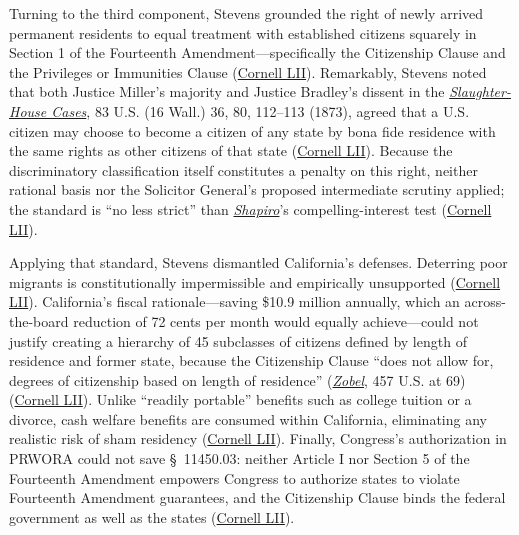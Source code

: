 \documentclass[12pt]{article}
\begin{document}
Turning to the third component, Stevens grounded the right of newly arrived permanent residents to equal treatment with established citizens squarely in Section 1 of the Fourteenth Amendment---specifically the Citizenship Clause and the Privileges or Immunities Clause (\href{https://www.law.cornell.edu/supremecourt/text/98-97}{Cornell LII}). Remarkably, Stevens noted that both Justice Miller's majority and Justice Bradley's dissent in the \href{https://www.law.cornell.edu/supremecourt/text/83/36}{\textit{Slaughter-House Cases}}, 83 U.S. (16 Wall.) 36, 80, 112--113 (1873), agreed that a U.S. citizen may choose to become a citizen of any state by bona fide residence with the same rights as other citizens of that state (\href{https://www.law.cornell.edu/supremecourt/text/98-97}{Cornell LII}). Because the discriminatory classification itself constitutes a penalty on this right, neither rational basis nor the Solicitor General's proposed intermediate scrutiny applied; the standard is ``no less strict'' than \href{https://supreme.justia.com/cases/federal/us/394/618/}{\textit{Shapiro}}'s compelling-interest test (\href{https://www.law.cornell.edu/supremecourt/text/98-97}{Cornell LII}).

Applying that standard, Stevens dismantled California's defenses. Deterring poor migrants is constitutionally impermissible and empirically unsupported (\href{https://www.law.cornell.edu/supremecourt/text/98-97}{Cornell LII}). California's fiscal rationale---saving \$10.9 million annually, which an across-the-board reduction of 72 cents per month would equally achieve---could not justify creating a hierarchy of 45 subclasses of citizens defined by length of residence and former state, because the Citizenship Clause ``does not allow for, degrees of citizenship based on length of residence'' (\href{https://supreme.justia.com/cases/federal/us/457/55/}{\textit{Zobel}}, 457 U.S. at 69) (\href{https://www.law.cornell.edu/supremecourt/text/98-97}{Cornell LII}). Unlike ``readily portable'' benefits such as college tuition or a divorce, cash welfare benefits are consumed within California, eliminating any realistic risk of sham residency (\href{https://www.law.cornell.edu/supremecourt/text/98-97}{Cornell LII}). Finally, Congress's authorization in PRWORA could not save \S~11450.03: neither Article I nor Section 5 of the Fourteenth Amendment empowers Congress to authorize states to violate Fourteenth Amendment guarantees, and the Citizenship Clause binds the federal government as well as the states (\href{https://www.law.cornell.edu/supremecourt/text/98-97}{Cornell LII}).
\end{document}
